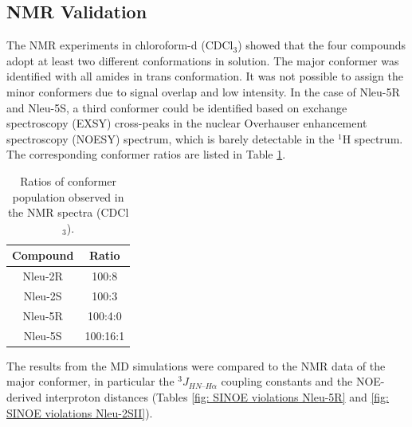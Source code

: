 \FloatBarrier

\subsection{NMR Validation}
The NMR experiments in chloroform-d (CDCl$_3$) showed that the four compounds adopt at least two different conformations in solution. \cite{Comeau2021}
The major conformer was identified with all amides in trans conformation. 
It was not possible to assign the minor conformers due to signal overlap and low intensity. In the case of Nleu-5R and Nleu-5S, a third conformer could be identified based on exchange spectroscopy (EXSY) cross-peaks in the nuclear Overhauser enhancement spectroscopy (NOESY) spectrum, which is barely detectable in the $^1$H spectrum. The corresponding conformer ratios are listed in Table \ref{tab: nmrConfRatios}.  

\begin{table}[h!]
    \centering
    \caption{Ratios of conformer population observed in the NMR spectra (CDCl$_3$).}
    \label{tab: nmrConfRatios}
    \begin{adjustbox}{max width=\textwidth}
    \begin{tabular}{cc}
    Compound & Ratio \\
    \hline
    Nleu-2R &	100:8 \\
    Nleu-2S &   100:3 \\
    Nleu-5R &   100:4:0 \\
    Nleu-5S &	100:16:1 \\
    \hline
    \end{tabular}
    \end{adjustbox}
\end{table}

The results from the MD simulations were compared to the NMR data of the major conformer, in particular the $^3J_{HN–H\alpha}$ coupling constants and the NOE-derived interproton distances (Tables \ref{fig: SINOE violations Nleu-5R} and \ref{fig: SINOE violations Nleu-2SII}).

